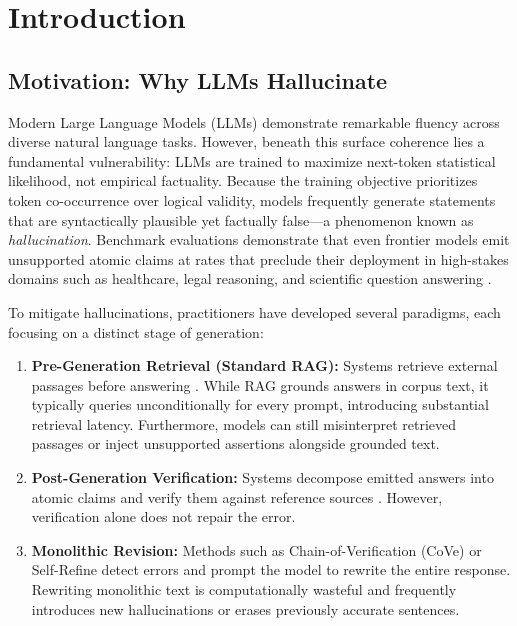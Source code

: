 
\section{Introduction}

\subsection{Motivation: Why LLMs Hallucinate}
Modern Large Language Models (LLMs) demonstrate remarkable fluency across diverse natural language tasks. However, beneath this surface coherence lies a fundamental vulnerability: LLMs are trained to maximize next-token statistical likelihood, not empirical factuality. Because the training objective prioritizes token co-occurrence over logical validity, models frequently generate statements that are syntactically plausible yet factually false---a phenomenon known as \emph{hallucination}. Benchmark evaluations demonstrate that even frontier models emit unsupported atomic claims at rates that preclude their deployment in high-stakes domains such as healthcare, legal reasoning, and scientific question answering \cite{ravichander2025halogen}.

To mitigate hallucinations, practitioners have developed several paradigms, each focusing on a distinct stage of generation:
\begin{enumerate}
  \item \textbf{Pre-Generation Retrieval (Standard RAG):} Systems retrieve external passages before answering \cite{asai2024selfrag,yan2024crag}. While RAG grounds answers in corpus text, it typically queries unconditionally for every prompt, introducing substantial retrieval latency. Furthermore, models can still misinterpret retrieved passages or inject unsupported assertions alongside grounded text.
  \item \textbf{Post-Generation Verification:} Systems decompose emitted answers into atomic claims and verify them against reference sources \cite{min2023factscore,wei2024longformfactuality}. However, verification alone does not repair the error.
  \item \textbf{Monolithic Revision:} Methods such as Chain-of-Verification (CoVe) \cite{dhuliawala2023cove} or Self-Refine \cite{madaan2023selfrefine} detect errors and prompt the model to rewrite the entire response. Rewriting monolithic text is computationally wasteful and frequently introduces new hallucinations or erases previously accurate sentences.
\end{enumerate}

